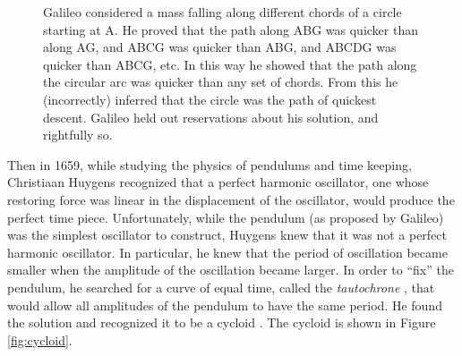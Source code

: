 \documentclass{article}
\theoremstyle{definition}
\begin{document}
\bigskip
\begin{figure}[H]
\caption{Galileo considered a mass falling along different chords 
of a circle starting at A.  He proved that the path along ABG was
quicker than along AG, and ABCG was quicker than ABG, and ABCDG
was quicker than ABCG, etc.  In this way he showed that the path
along the circular arc was quicker than any set of chords. From
this he (incorrectly) inferred that the circle was the path of 
quickest descent. Galileo held out reservations about his
solution, and rightfully so.} 
\label{fig:galileo}
\end{figure}


\noindent
Then in 1659, while studying the physics of pendulums and time
keeping, Christiaan Huygens \cite{wiki:huygens} recognized that a
perfect harmonic oscillator, one whose restoring force was linear
in the displacement of the oscillator, would produce the perfect
time piece. Unfortunately, while the pendulum (as proposed by
Galileo) was the simplest oscillator to construct, Huygens knew
that it was not a perfect harmonic oscillator. In particular, he
knew that the period of oscillation became smaller when the
amplitude of the oscillation became larger. In order to “fix” the
pendulum, he searched for a curve of equal time, called the
\emph{tautochrone} \cite{wiki:tautochrone}, that would allow all
amplitudes of the pendulum to have the same period. He found the
solution and recognized it to be a cycloid \cite{wiki:cycloid}. 
The cycloid is shown in Figure \ref{fig:cycloid}.
\end{document}
